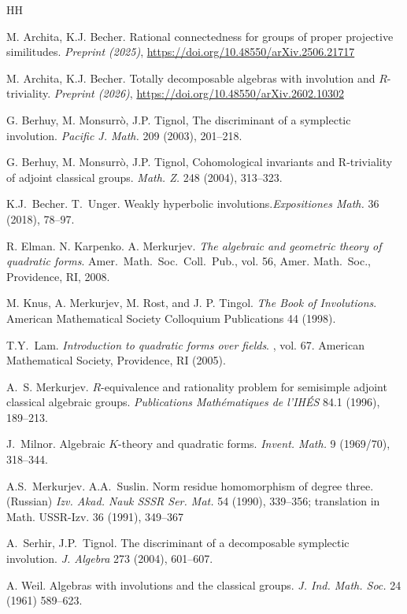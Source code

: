 \documentclass[twoside,11pt]{amsart}
\numberwithin{equation}{section}
\theoremstyle{definition}
\begin{document}
\begin{thebibliography}{HH}

M. Archita, K.J. Becher. 
{Rational connectedness for groups of proper projective similitudes}. 
\emph{Preprint (2025)},
\url{https://doi.org/10.48550/arXiv.2506.21717}

 M. Archita, K.J. Becher. {Totally decomposable algebras with involution and $R$-triviality}. \emph{Preprint (2026)},
\url{https://doi.org/10.48550/arXiv.2602.10302}

  G. Berhuy, M. Monsurrò, J.P. Tignol, The discriminant of a symplectic involution.
\emph{Pacific J. Math.} 209 (2003),  201--218.

 G. Berhuy, M. Monsurrò, J.P. Tignol, 
Cohomological invariants and R-triviality of adjoint classical groups.
\emph{Math. Z.} 248 (2004),  313--323.

 K.J.~Becher. T.~Unger. Weakly hyperbolic involutions.\emph{Expositiones Math.} 36 (2018), 78--97.

R. Elman. N. Karpenko. A. Merkurjev. 
{\em The algebraic and geometric theory of quadratic forms}. 
Amer.~Math.~Soc.~Coll.~Pub., vol. {56}, Amer. Math.~Soc., Providence, RI, 2008.





 M. Knus, A. Merkurjev, M. Rost, and J. P. Tingol. \emph{The Book of Involutions}. American Mathematical Society Colloquium Publications 44 (1998).



 T.Y.~Lam. \newblock \emph{Introduction to quadratic forms over fields}. , vol. 67. American Mathematical Society, Providence, RI (2005).

   
 A.~S. Merkurjev. $R$-equivalence and rationality problem for semisimple adjoint classical algebraic groups. \emph{Publications Math\'ematiques de  
	l'IH\'ES} 84.1 (1996), 189--213. 

 J.~Milnor.
Algebraic $K$-theory and quadratic forms.
\emph{Invent. Math.} 9 (1969/70), 318–344.

 A.S.~Merkurjev. A.A.~Suslin.
Norm residue homomorphism of degree three.(Russian)
\emph{Izv. Akad. Nauk SSSR Ser. Mat.} 54 (1990), 339--356; translation in
Math. USSR-Izv. 36 (1991), 
349--367

 A.~Serhir, J.P.~Tignol.
The discriminant of a decomposable symplectic involution.
\emph{J. Algebra} 273 (2004), 601--607.

 A. Weil. Algebras with involutions and the classical groups. \emph{J. Ind. Math. Soc.} 24 (1961) 589--623.
\end{thebibliography}
\end{document}
